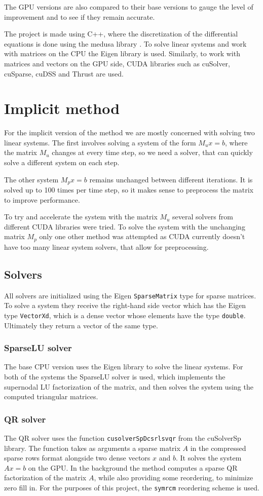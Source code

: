 \documentclass{article}
\begin{document}
The GPU versions are also compared to their base versions to gauge the level of improvement and to 
see if they remain accurate.

The project is made using C++, where the discretization of the differential equations is done using 
the medusa library \cite{medusa}. To solve linear systems and work with matrices on the CPU the 
Eigen library is used. Similarly, to work with matrices and vectors on the GPU side, 
CUDA libraries such as cuSolver, cuSparse, cuDSS and Thrust are used.
\section{Implicit method}
For the implicit version of the method we are mostly concerned with solving two linear systems.
The first involves solving a system of the form \(M_u x = b\), where the matrix \(M_u\) changes at
every time step, so we need a solver, that can quickly solve a different system on each step.

The other system \(M_p x = b\) remains unchanged between different 
iterations. It is solved up to 100 times per time step, so it makes sense to preprocess the 
matrix to improve performance.

To try and accelerate the system with the matrix \(M_u\) several solvers from different CUDA libraries 
were tried. To solve the system with the unchanging matrix \(M_p\) only one other method was attempted
as CUDA currently doesn't have too many linear system solvers, that allow for preprocessing. 

\subsection{Solvers}
All solvers are initialized using the Eigen \verb|SparseMatrix| type for sparse matrices. 
To solve a system they receive the right-hand side vector which has the Eigen type \verb|VectorXd|,
which is a dense vector whose elements have the type \verb|double|. Ultimately they return 
a vector of the same type.
\subsubsection{SparseLU solver}
The base CPU version uses the Eigen library to solve the linear systems. For both of the systems 
the SparseLU solver is used, which implements the supernodal LU factorization of the matrix, and then
solves the system using the computed triangular matrices.
\subsubsection{QR solver}
The QR solver uses the function \verb|cusolverSpDcsrlsvqr| from the cuSolverSp library. 
The function takes as arguments a sparse matrix \(A\) in the 
compressed sparse rows format alongside two dense vectors \(x\) and \(b\). It solves the 
system \(Ax=b\) on the GPU. In the background the method computes a sparse QR factorization of the matrix \(A\),
while also providing some reordering, to minimize zero fill in. For the purposes of this project,
the \verb|symrcm| reordering scheme is used.
\end{document}
